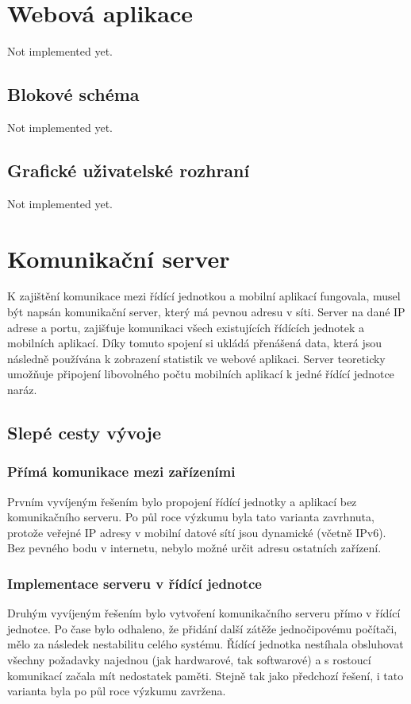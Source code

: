\documentclass[FM,DP]{tulthesis}  %
\begin{document}

\chapter{Webová aplikace}
Not implemented yet.

\section{Blokové schéma}
Not implemented yet.

\section{Grafické uživatelské rozhraní}
Not implemented yet.


\chapter{Komunikační server}
K zajištění komunikace mezi řídící jednotkou a mobilní aplikací fungovala, musel být napsán komunikační server, který má pevnou adresu v síti. Server na dané IP adrese a portu, zajišťuje komunikaci všech existujících řídících jednotek a mobilních aplikací. Díky tomuto spojení si ukládá přenášená data, která jsou následně používána k zobrazení statistik ve webové aplikaci. Server teoreticky umožňuje připojení libovolného počtu mobilních aplikací k jedné řídící jednotce naráz.

\section{Slepé cesty vývoje}

\subsection{Přímá komunikace mezi zařízeními}
Prvním vyvíjeným řešením bylo propojení řídící jednotky a aplikací bez komunikačního serveru. Po půl roce výzkumu byla tato varianta zavrhnuta, protože veřejné IP adresy v mobilní datové sítí jsou dynamické (včetně IPv6). Bez pevného bodu v internetu, nebylo možné určit adresu ostatních zařízení.

\subsection{Implementace serveru v řídící jednotce}
Druhým vyvíjeným řešením bylo vytvoření komunikačního serveru přímo v řídící jednotce. Po čase bylo odhaleno, že přidání další zátěže jednočipovému počítači, mělo za následek nestabilitu celého systému. Řídící jednotka nestíhala obsluhovat všechny požadavky najednou (jak hardwarové, tak softwarové) a s rostoucí komunikací začala mít nedostatek paměti. Stejně tak jako předchozí řešení, i tato varianta byla po půl roce výzkumu zavržena.
\end{document}
